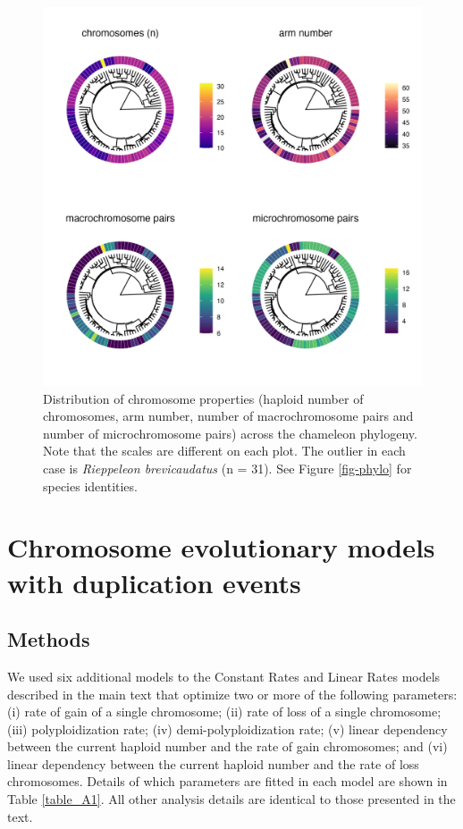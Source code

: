 \documentclass[a4paper, 12pt]{article}
\begin{document}
\newpage
\begin{figure}[H]
 \centering
  \includegraphics[width = \linewidth]{figures/trees-chromosome-properties.png}
  \caption{Distribution of chromosome properties (haploid number of chromosomes, arm number, number of macrochromosome pairs and number of microchromosome pairs) across the chameleon phylogeny. Note that the scales are different on each plot. The outlier in each case is \textit{Rieppeleon brevicaudatus} (n = 31). See Figure \ref{fig-phylo} for species identities.
}
  \label{fig-properties}
\end{figure} 

\newpage
\section{Chromosome evolutionary models with duplication events}

\subsection{Methods}

We used six additional models to the Constant Rates and Linear Rates models described in the main text that optimize two or more of the following parameters: (i) rate of gain of a single chromosome; (ii) rate of loss of a single chromosome; (iii) polyploidization rate; (iv) demi-polyploidization rate; (v) linear dependency between the current haploid number and the rate of gain chromosomes; and (vi) linear dependency between the current haploid number and the rate of loss chromosomes. Details of which parameters are fitted in each model are shown in Table \ref{table_A1}. All other analysis details are identical to those presented in the text.
\end{document}
